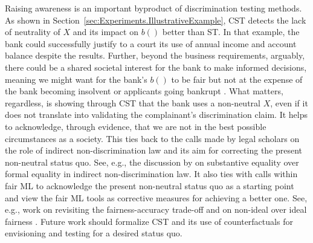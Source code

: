 Raising awareness is an important byproduct of discrimination testing methods.
As shown in Section~\ref{sec:Experiments.IllustrativeExample}, CST detects the lack of neutrality of $X$ and its impact on $b()$ better than ST.
In that example, the bank could successfully justify to a court its use of annual income and account balance despite the results.
Further, beyond the business requirements, arguably, there could be a shared societal interest for the bank to make informed decisions, meaning we might want for the bank's $b()$ to be fair but not at the expense of the bank becoming insolvent or applicants going bankrupt \parencite{DBLP:journals/eor/KozodoiJL22, DBLP:conf/fat/DAmourSABSH20, DBLP:conf/fat/SchwobelR22}.
What matters, regardless, is showing through CST that the bank uses a non-neutral $X$, even if it does not translate into validating the complainant's discrimination claim.
%
It helps to acknowledge, through evidence, that we are not in the best possible circumstances as a society.
This ties back to the calls made by legal scholars on the role of indirect non-discrimination law and its aim for correcting the present non-neutral status quo. 
See, e.g., the discussion by \textcite{Wachter2020BiasPreserving} on substantive equality over formal equality in indirect non-discrimination law.
%
It also ties with calls within fair ML to acknowledge the present non-neutral status quo as a starting point and view the fair ML tools as corrective measures for achieving a better one.
See, e.g., work on revisiting the fairness-accuracy trade-off \parencite{DBLP:conf/nips/WickpT19} and on non-ideal over ideal fairness \parencite{Otto2024_WhatisImpossibleAboutAlgoFairness}.
%
Future work should formalize CST and its use of counterfactuals for envisioning and testing for a desired status quo. 

%
%
